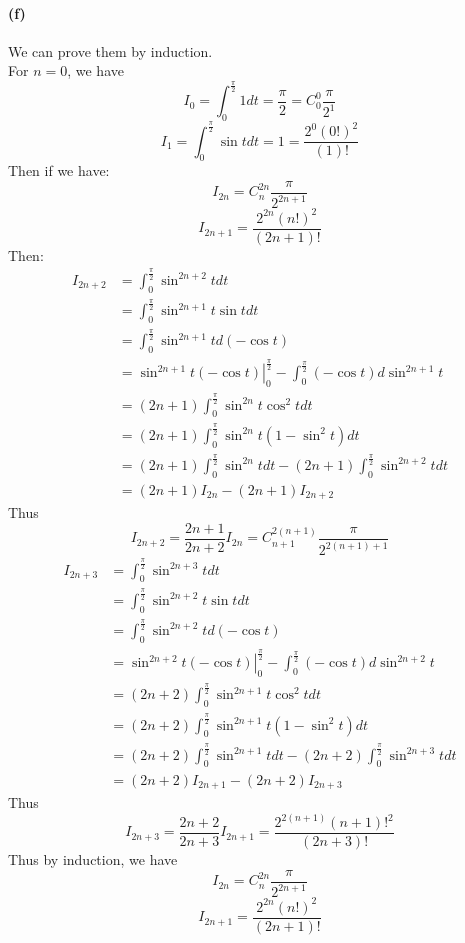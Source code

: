 \documentclass{article}
\begin{document}
\paragraph[short]{(f)}
{
We can prove them by induction.\\
For $n=0$, we have
$$I_0=\int_{0}^{\frac{\pi}{2}}1 dt=\frac{\pi}{2}=C^0_0\frac{\pi}{2^1}$$
$$I_1=\int_{0}^{\frac{\pi}{2}}\sin t dt=1=\frac{2^0\left(0!\right)^2}{\left(1\right)!}$$
Then if we have:
$$I_{2n}=C^{2n}_n\frac{\pi}{2^{2n+1}}$$
$$I_{2n+1}=\frac{2^{2n}\left(n!\right)^2}{\left(2n+1\right)!}$$
Then:
\begin{align*}
    I_{2n+2}&=\int_{0}^{\frac{\pi}{2}}\sin^{2n+2}t dt\\
    &=\int_{0}^{\frac{\pi}{2}}\sin^{2n+1}t\sin t dt\\
    &=\int_{0}^{\frac{\pi}{2}}\sin^{2n+1}t d\left(-\cos t\right)\\
    &=\left.\sin^{2n+1}t\left(-\cos t\right)\right|_{0}^{\frac{\pi}{2}}-\int_{0}^{\frac{\pi}{2}}\left(-\cos t\right)d\sin^{2n+1}t\\
    &=\left(2n+1\right)\int_{0}^{\frac{\pi}{2}}\sin^{2n}t\cos^2t dt\\
    &=\left(2n+1\right)\int_{0}^{\frac{\pi}{2}}\sin^{2n}t\left(1-\sin^2t\right) dt\\
    &=\left(2n+1\right)\int_{0}^{\frac{\pi}{2}}\sin^{2n}t dt-\left(2n+1\right)\int_{0}^{\frac{\pi}{2}}\sin^{2n+2}t dt\\
    &=\left(2n+1\right)I_{2n}-\left(2n+1\right)I_{2n+2}
\end{align*}
Thus
$$I_{2n+2}=\frac{2n+1}{2n+2}I_{2n}=C^{2\left(n+1\right)}_{n+1}\frac{\pi}{2^{2\left(n+1\right)+1}}$$
\begin{align*}
    I_{2n+3}&=\int_{0}^{\frac{\pi}{2}}\sin^{2n+3}t dt\\
    &=\int_{0}^{\frac{\pi}{2}}\sin^{2n+2}t\sin t dt\\
    &=\int_{0}^{\frac{\pi}{2}}\sin^{2n+2}t d\left(-\cos t\right)\\
    &=\left.\sin^{2n+2}t\left(-\cos t\right)\right|_{0}^{\frac{\pi}{2}}-\int_{0}^{\frac{\pi}{2}}\left(-\cos t\right)d\sin^{2n+2}t\\
    &=\left(2n+2\right)\int_{0}^{\frac{\pi}{2}}\sin^{2n+1}t\cos^2t dt\\
    &=\left(2n+2\right)\int_{0}^{\frac{\pi}{2}}\sin^{2n+1}t\left(1-\sin^2t\right) dt\\
    &=\left(2n+2\right)\int_{0}^{\frac{\pi}{2}}\sin^{2n+1}t dt-\left(2n+2\right)\int_{0}^{\frac{\pi}{2}}\sin^{2n+3}t dt\\
    &=\left(2n+2\right)I_{2n+1}-\left(2n+2\right)I_{2n+3}
\end{align*}
Thus
$$I_{2n+3}=\frac{2n+2}{2n+3}I_{2n+1}=\frac{2^{2\left(n+1\right)}\left(n+1\right)!^2}{\left(2n+3\right)!}$$
Thus by induction, we have
$$I_{2n}=
C^{2n}_n\frac{\pi}{2^{2n+1}}$$
$$I_{2n+1}=\frac{2^{2n}\left(n!\right)^2}{\left(2n+1\right)!}$$
}
\end{document}
